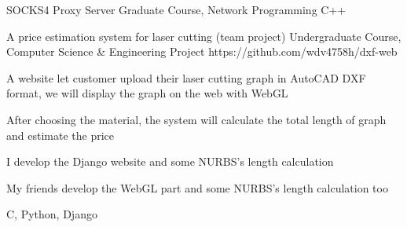 \begin{cvopensources}
  \cvopensource
    {SOCKS4 Proxy Server}
    {Graduate Course, Network Programming}
    {}
    {}
    {C++}

  \cvopensource
    {A price estimation system for laser cutting (team project)}
    {Undergraduate Course, Computer Science \& Engineering Project}
    {https://github.com/wdv4758h/dxf-web}
    {
      \begin{cvitems}
        \item {A website let customer upload their laser cutting graph in AutoCAD DXF format, we will display the graph on the web with WebGL}
        \item {After choosing the material, the system will calculate the total length of graph and estimate the price}
        \item {I develop the Django website and some NURBS's length calculation}
        \item {My friends develop the WebGL part and some NURBS's length calculation too}
      \end{cvitems}
    }
    {C, Python, Django}

\end{cvopensources}
